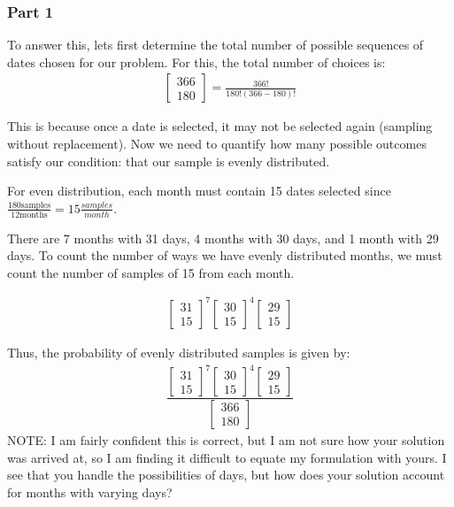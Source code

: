 \documentclass{article}
\begin{document}
\subsubsection*{Part 1}
To answer this, lets first determine the total number of possible sequences of dates chosen for our problem. For this, the total number of choices is:
\begin{align*}
\begin{bmatrix}
366 \\
180
\end{bmatrix} = \frac{366!}{180!(366-180)!}
\end{align*}

This is because once a date is selected, it may not be selected again (sampling without replacement). Now we need to quantify how many possible outcomes satisfy our condition: that our sample is evenly distributed.

For even distribution, each month must contain 15 dates selected since $\frac{180\text{samples}}{12\text{months}} = 15\frac{samples}{month}$.

There are 7 months with 31 days, 4 months with 30 days, and 1 month with 29 days. To count the number of ways we have evenly distributed months, we must count the number of samples of 15 from each month.

\begin{align*}
\begin{bmatrix}
31 \\
15
\end{bmatrix}^7  
\begin{bmatrix}
30 \\
15
\end{bmatrix}^4  
\begin{bmatrix}
29 \\
15
\end{bmatrix}
\end{align*}

Thus, the probability of evenly distributed samples is given by:
\begin{align*}
\boxed{\dfrac{\begin{bmatrix}
31 \\
15
\end{bmatrix}^7  
\begin{bmatrix}
30 \\
15
\end{bmatrix}^4 
\begin{bmatrix}
29 \\
15
\end{bmatrix}}{\begin{bmatrix}
366 \\
180
\end{bmatrix}}}
\end{align*}
NOTE: I am fairly confident this is correct, but I am not sure how your solution was arrived at, so I am finding it difficult to equate my formulation with yours. I see that you handle the possibilities of days, but how does your solution account for months with varying days?
\end{document}
